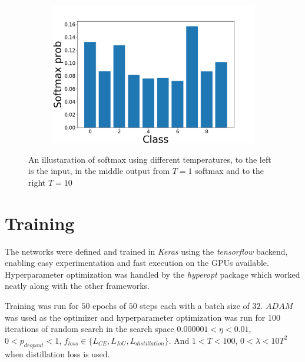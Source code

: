 \documentclass{kththesis}
\begin{document}
\begin{figure}[h]
    ~
    \begin{subfigure}[b]{0.3\textwidth}
        \includegraphics[width=\textwidth]{softmaxT10}
      \end{subfigure}
     \caption{An illustaration of softmax using different temperatures, to the
       left is the input, in the middle output from \(T=1\) softmax and to the
       right \(T = 10\)}\label{fig:softmax}
\end{figure}

\section{Training}
The networks were defined and trained in \textit{Keras} \parencite{keras} using the
\textit{tensorflow} \parencite{tensorflow} backend, enabling easy
experimentation and fast execution on the GPUs available. Hyperparameter
optimization was handled by the \textit{hyperopt} \parencite{hyperopt} package which worked neatly
along with the other frameworks.

Training was run for \(50\) epochs of \(50\) steps each with a batch size of \(32\).
\(ADAM\) \parencite{ADAM} was used as the optimizer and hyperparameter
optimization was run for 100 iterations of random search in the search space
\(0.000001 < \eta < 0.01\), \( 0 < p_{dropout} < 1\), \(f_{loss} \in \{L_{CE},
L_{IoU}, L_{distillation}\}\). And \( 1 < T < 100\), \(0< \lambda <10T^2\) when
distillation loss is used.
\end{document}
